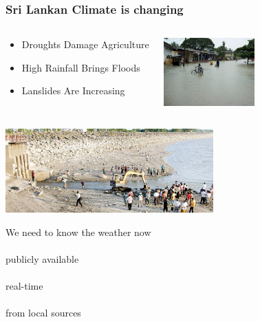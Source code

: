 \documentclass[serif,mathserif]{beamer}
\begin{document}
\begin{frame}
  \frametitle{Sri Lankan Climate is changing}
\begin{columns}
\begin{center}
\begin{itemize}
 \item Droughts Damage Agriculture
 \item High Rainfall Brings Floods
 \item Lanslides Are Increasing
\end{itemize}
\end{center}

\begin{center}
   \includegraphics[width=3.5cm]{sri-lanka-flood1}
   \vspace{2mm}
\end{center}
\end{columns}
\includegraphics[width=8cm]{20120812_Polonnaruwa-Prakramasamudrya}
\end{frame}


\begin{frame}
\begin{center}
We need to know the weather now\\
\ \\
publicly available\\
\ \\
real-time\\
\ \\
from local sources
\end{center}
\end{frame}

\end{document}
